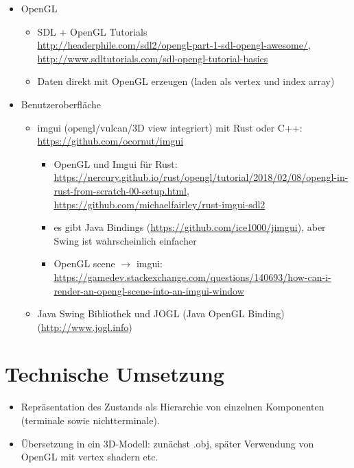 \begin{itemize}
 \item OpenGL
 \begin {itemize}
  \item SDL + OpenGL Tutorials \\ \url{http://headerphile.com/sdl2/opengl-part-1-sdl-opengl-awesome/}, \\ \url{http://www.sdltutorials.com/sdl-opengl-tutorial-basics}
  \item Daten direkt mit OpenGL erzeugen (laden als vertex und index array)
 \end {itemize}

 \item Benutzeroberfläche
 \begin{itemize}
  \item imgui (opengl/vulcan/3D view integriert) mit Rust oder C++: \url{https://github.com/ocornut/imgui}
  
  \begin{itemize}
   \item OpenGL und Imgui für Rust: \url{https://nercury.github.io/rust/opengl/tutorial/2018/02/08/opengl-in-rust-from-scratch-00-setup.html}, \url{https://github.com/michaelfairley/rust-imgui-sdl2}
   \item es gibt Java Bindings (\url{https://github.com/ice1000/jimgui}), aber Swing ist wahrscheinlich einfacher
   \item OpenGL scene $\rightarrow$ imgui: \url{https://gamedev.stackexchange.com/questions/140693/how-can-i-render-an-opengl-scene-into-an-imgui-window}
  \end{itemize}

  
  \item Java Swing Bibliothek und JOGL (Java OpenGL Binding) (\url{http://www.jogl.info})
 \end{itemize}
\end{itemize}

\section{Technische Umsetzung}

\begin{itemize}
 \item Repräsentation des Zustands als Hierarchie von einzelnen Komponenten (terminale sowie nichtterminale).
 \item Übersetzung in ein 3D-Modell: zunächst .obj, später Verwendung von OpenGL mit vertex shadern etc.\
\end{itemize}

